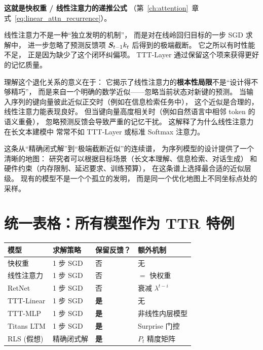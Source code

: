 \textbf{这就是快权重 / 线性注意力的递推公式}
（第~\ref{ch:attention}~章式~\eqref{eq:linear_attn_recurrence}）。

\begin{insight}[title=线性注意力是在线回归的``最粗暴''近似]
线性注意力不是一种``独立发明的机制''，
而是对在线岭回归目标的一步 SGD 求解中，
进一步忽略了预测反馈项 $\boldsymbol{S}_{t-1} k_t$ 后得到的极端截断。
它之所以有时性能不足，
正是因为缺少了这个闭环纠偏项。
TTT-Layer 通过保留这个项来获得更好的记忆质量。
\end{insight}

理解这个退化关系的意义在于：
它揭示了线性注意力的\textbf{根本性局限}不是``设计得不够精巧''，
而是来自一个明确的数学近似——忽略当前状态对新键的预测。
当输入序列的键向量彼此近似正交时（例如在信息检索任务中），
这个近似是合理的，线性注意力能表现良好。
但当键向量高度相关时（例如自然语言中相邻 token 的语义重叠），
忽略预测反馈会导致严重的记忆干扰。
这解释了为什么线性注意力在长文本建模中
常常不如 TTT-Layer 或标准 Softmax 注意力。

这条从``精确闭式解''到``极端截断近似''的连续谱，
为序列模型的设计提供了一个清晰的地图：
研究者可以根据目标场景（长文本理解、信息检索、对话生成）
和硬件约束（内存限制、延迟要求、训练预算），
在这条谱上选择最合适的近似层级。
现有的模型不是一个个孤立的发明，
而是同一个优化地图上不同坐标点处的采样。

\section{统一表格：所有模型作为 TTR 特例}
\label{sec:ttr_unification}


\begin{center}
\begin{tabular}{p{2.5cm}p{3.5cm}p{2.5cm}p{3.5cm}}
\toprule
\textbf{模型} & \textbf{求解策略} & \textbf{保留反馈？} & \textbf{额外机制} \\
\midrule
快权重 & 1 步 SGD & 否 & 无 \\
线性注意力 & 1 步 SGD & 否 & $= $ 快权重 \\
RetNet & 1 步 SGD & 否 & 衰减 $\lambda^{t-i}$ \\
TTT-Linear & 1 步 SGD & \textbf{是} & 无 \\
TTT-MLP & 1 步 SGD & \textbf{是} & 非线性内层模型 \\
Titans LTM & 1 步 SGD & \textbf{是} & Surprise 门控 \\
RLS (假想) & 精确闭式解 & \textbf{是} & $P_t$ 精度矩阵 \\
\bottomrule
\end{tabular}
\end{center}


